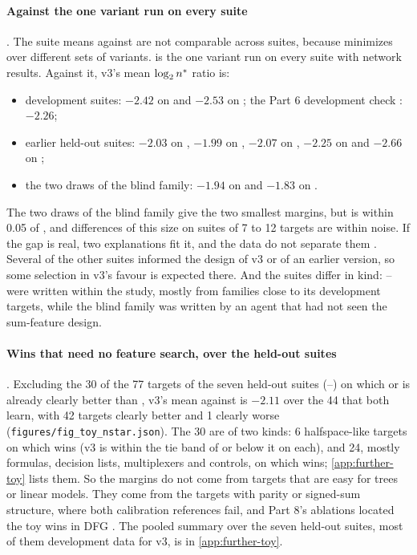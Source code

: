 \paragraph{Against the one variant run on every suite} . The suite means against  are not comparable across suites, because  minimizes over different sets of variants.  is the one variant run on every suite with network results. Against it, v3's mean $\log_2n^{*}$ ratio is:
\begin{itemize}
\item development suites: $-2.42$ on  and $-2.53$ on ; the Part 6 development check : $-2.26$;
\item earlier held-out suites: $-2.03$ on , $-1.99$ on , $-2.07$ on , $-2.25$ on  and $-2.66$ on ;
\item the two draws of the blind family: $-1.94$ on  and $-1.83$ on .
\end{itemize}
The two draws of the blind family give the two smallest margins, but  is within 0.05 of , and differences of this size on suites of 7 to 12 targets are within noise. If the gap is real, two explanations fit it, and the data do not separate them . Several of the other suites informed the design of v3 or of an earlier version, so some selection in v3's favour is expected there. And the suites differ in kind: -- were written within the study, mostly from families close to its development targets, while the blind family was written by an agent that had not seen the sum-feature design.

\paragraph{Wins that need no feature search, over the held-out suites} . Excluding the 30 of the 77 targets of the seven held-out suites (--) on which  or  is already clearly better than , v3's mean against  is $-2.11$ over the 44 that both learn, with 42 targets clearly better and 1 clearly worse (\texttt{figures/fig\_toy\_nstar.json}). The 30 are of two kinds: 6 halfspace-like targets on which  wins (v3 is within the tie band of  or below it on each), and 24, mostly formulas, decision lists, multiplexers and controls, on which  wins; \cref{app:further-toy} lists them. So the margins do not come from targets that are easy for trees or linear models. They come from the targets with parity or signed-sum structure, where both calibration references fail, and Part 8's ablations located the toy wins in DFG \cite{discretelearners2026}. The pooled summary over the seven held-out suites, most of them development data for v3, is in \cref{app:further-toy}.

